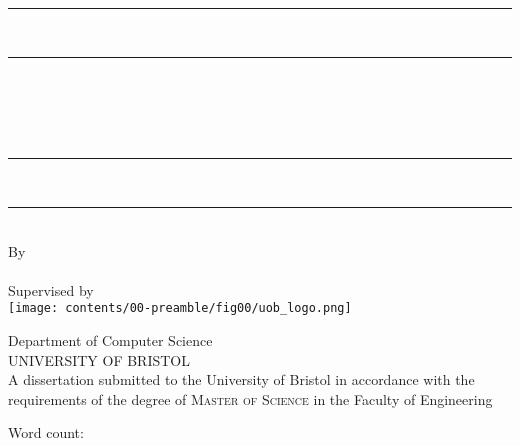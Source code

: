 \begin{titlepage}
    \centering

    \vspace*{2.2cm}

    \rule{\textwidth}{2pt} \\[-2ex]
    \rule{\textwidth}{0.5pt} \\[0.7cm]

    {\LARGE\bfseries \myReportTitle} \\[0.3cm]

    \parbox{0.89\textwidth}{\centering
        {\large \textit{\myReportSubtitle}}
    } \\[0.3cm]

    \rule{\textwidth}{0.5pt} \\[-2ex]
    \rule{\textwidth}{2pt} \\[0.3cm]

    {\large By} \\[0.3cm]
    {\large \myName} \\[0.3cm]
    {\normalsize Supervised by \mySupervisor} \\[1cm]

    \texttt{[image: contents/00-preamble/fig00/uob\_logo.png]} \\[1cm]

    \begin{minipage}{0.65\textwidth}
        \centering
        {\Large Department of Computer Science} \\[0.3cm]
        {\Large \textsc{UNIVERSITY OF BRISTOL}} \\[1cm]
        {\normalsize A dissertation submitted to the University of Bristol
        in accordance with the requirements of the degree of \textsc{Master of Science}
        in the Faculty of Engineering} \\[1cm]
        {\large \mySubmissionMonthYear}
    \end{minipage}

    \vspace*{1cm}


    \begin{flushright}
        Word count: \wordCount
    \end{flushright}

    \vspace*{2.2cm}

\end{titlepage}